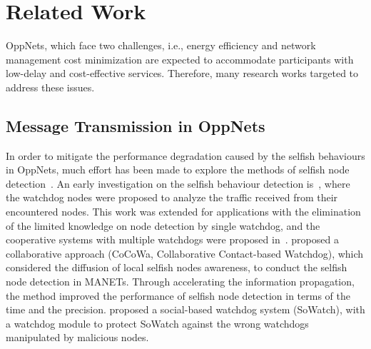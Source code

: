 \section{Related Work}
\label{sec:related}
OppNets, which face two challenges, 
i.e., energy efficiency and network management cost minimization
are expected to accommodate participants 
with low-delay and cost-effective services.
Therefore, many research works targeted to address these issues.

\subsection{Message Transmission in OppNets}
In order to mitigate the performance degradation caused by
the selfish behaviours in OppNets,
much effort has been made to explore
the methods of selfish node
detection~\cite{DBLP:journals/tvt/LiSWJSZ11, DBLP:journals/comsur/JedariXN18}.
An early investigation on the selfish behaviour detection
is~\cite{DBLP:conf/mobicom/MartiGLB00},
where the watchdog nodes were proposed
to analyze the traffic received from their encountered nodes.
This work was extended for applications with
the elimination of the limited knowledge on node detection by single watchdog,
and the cooperative systems with multiple watchdogs were proposed
in~\cite{DBLP:journals/tmc/Hernandez-Orallo15, DBLP:journals/tie/DiasRXM15,
DBLP:journals/fgcs/JedariXCDTA19}.
\cite{DBLP:journals/tmc/Hernandez-Orallo15} proposed
a collaborative approach (CoCoWa, Collaborative Contact-based Watchdog),
which considered the diffusion of local selfish nodes awareness,
to conduct the selfish node detection in MANETs.
Through accelerating the information propagation,
the method improved the performance of selfish node detection
in terms of the time and the precision.
\cite{DBLP:journals/fgcs/JedariXCDTA19} proposed
a social-based watchdog system (SoWatch),
with a watchdog module to protect SoWatch
against the wrong watchdogs manipulated by malicious nodes.

